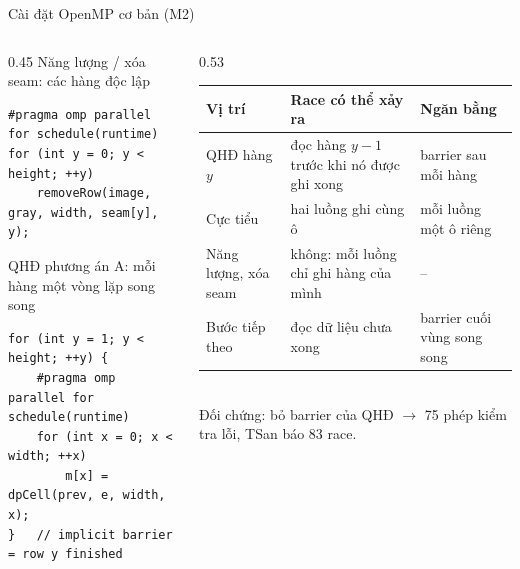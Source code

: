 \documentclass[aspectratio=169,11pt]{beamer}
\begin{document}
\begin{frame}[fragile]{Cài đặt OpenMP cơ bản (M2)}
  \begin{columns}[T]
    \begin{column}{0.45\textwidth}
      \footnotesize Năng lượng / xóa seam: các hàng độc lập
\begin{lstlisting}
#pragma omp parallel for schedule(runtime)
for (int y = 0; y < height; ++y)
    removeRow(image, gray, width, seam[y], y);
\end{lstlisting}
      \footnotesize QHĐ phương án A: mỗi hàng một vòng lặp song song
\begin{lstlisting}
for (int y = 1; y < height; ++y) {
    #pragma omp parallel for schedule(runtime)
    for (int x = 0; x < width; ++x)
        m[x] = dpCell(prev, e, width, x);
}   // implicit barrier = row y finished
\end{lstlisting}
    \end{column}
    \begin{column}{0.53\textwidth}
      \scriptsize
      \begin{tabular}{@{}>{\raggedright\arraybackslash}p{1.6cm}>{\raggedright\arraybackslash}p{2.7cm}>{\raggedright\arraybackslash}p{2.6cm}@{}}
        \toprule
        Vị trí & Race có thể xảy ra & Ngăn bằng \\
        \midrule
        QHĐ hàng $y$ & đọc hàng $y-1$ trước khi nó được ghi xong & barrier sau mỗi hàng \\
        Cực tiểu & hai luồng ghi cùng ô & mỗi luồng một ô riêng \\
        Năng lượng, xóa seam & không: mỗi luồng chỉ ghi hàng của mình & -- \\
        Bước tiếp theo & đọc dữ liệu chưa xong & barrier cuối vùng song song \\
        \bottomrule
      \end{tabular}\\[6pt]
      Đối chứng: bỏ barrier của QHĐ $\to$ 75 phép kiểm tra lỗi, TSan báo 83 race.
    \end{column}
  \end{columns}
\end{frame}
\end{document}
